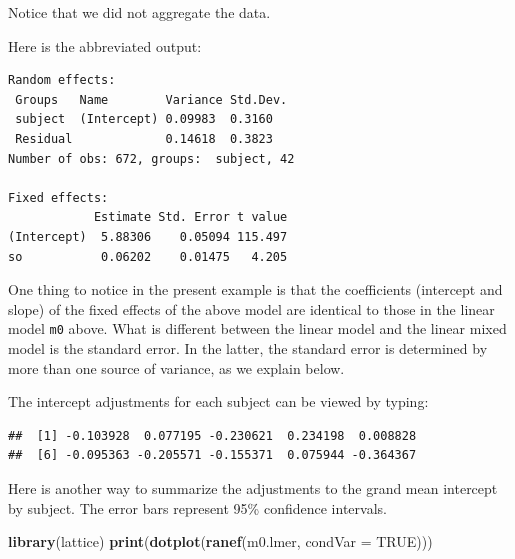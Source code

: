\documentclass[12pt,]{krantz}
\newenvironment{Shaded}{\begin{snugshade}}{\end{snugshade}}
\newcommand{\CommentTok}[1]{\textcolor[rgb]{0.56,0.35,0.01}{\textit{#1}}}
\newcommand{\DataTypeTok}[1]{\textcolor[rgb]{0.13,0.29,0.53}{#1}}
\newcommand{\DecValTok}[1]{\textcolor[rgb]{0.00,0.00,0.81}{#1}}
\newcommand{\KeywordTok}[1]{\textcolor[rgb]{0.13,0.29,0.53}{\textbf{#1}}}
\newcommand{\NormalTok}[1]{#1}
\newcommand{\OperatorTok}[1]{\textcolor[rgb]{0.81,0.36,0.00}{\textbf{#1}}}
\newcommand{\OtherTok}[1]{\textcolor[rgb]{0.56,0.35,0.01}{#1}}
\begin{document}
Notice that we did not aggregate the data.

Here is the abbreviated output:

\begin{verbatim}
Random effects:
 Groups   Name        Variance Std.Dev.
 subject  (Intercept) 0.09983  0.3160  
 Residual             0.14618  0.3823  
Number of obs: 672, groups:  subject, 42

Fixed effects:
            Estimate Std. Error t value
(Intercept)  5.88306    0.05094 115.497
so           0.06202    0.01475   4.205
\end{verbatim}

One thing to notice in the present example is that the coefficients (intercept and slope) of the fixed effects of the above model are identical to those in the linear model \texttt{m0} above. What is different between the linear model and the linear mixed model is the standard error. In the latter, the standard error is determined by more than one source of variance, as we explain below.

The intercept adjustments for each subject can be viewed by typing:

\begin{Shaded}
\end{Shaded}

\begin{verbatim}
##  [1] -0.103928  0.077195 -0.230621  0.234198  0.008828
##  [6] -0.095363 -0.205571 -0.155371  0.075944 -0.364367
\end{verbatim}

Here is another way to summarize the adjustments to the grand mean intercept by subject. The error bars represent 95\% confidence intervals.

\begin{Shaded}
\begin{Highlighting}[]
\KeywordTok{library}\NormalTok{(lattice)}
\KeywordTok{print}\NormalTok{(}\KeywordTok{dotplot}\NormalTok{(}\KeywordTok{ranef}\NormalTok{(m0.lmer, }\DataTypeTok{condVar =} \OtherTok{TRUE}\NormalTok{)))}
\end{Highlighting}
\end{Shaded}
\end{document}
